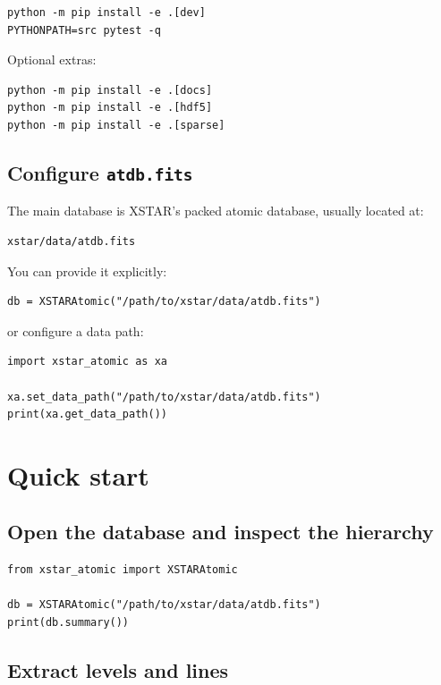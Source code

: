\documentclass[11pt]{article}
\begin{document}
\begin{lstlisting}[style=ctterminal]
python -m pip install -e .[dev]
PYTHONPATH=src pytest -q
\end{lstlisting}

Optional extras:

\begin{lstlisting}[style=ctterminal]
python -m pip install -e .[docs]
python -m pip install -e .[hdf5]
python -m pip install -e .[sparse]
\end{lstlisting}

\subsection{Configure \texttt{atdb.fits}}

The main database is XSTAR's packed atomic database, usually located at:

\begin{lstlisting}[style=ctterminal]
xstar/data/atdb.fits
\end{lstlisting}

You can provide it explicitly:

\begin{lstlisting}[style=ctpython]
db = XSTARAtomic("/path/to/xstar/data/atdb.fits")
\end{lstlisting}

or configure a data path:

\begin{lstlisting}[style=ctpython]
import xstar_atomic as xa

xa.set_data_path("/path/to/xstar/data/atdb.fits")
print(xa.get_data_path())
\end{lstlisting}

\section{Quick start}

\subsection{Open the database and inspect the hierarchy}

\begin{lstlisting}[style=ctpython]
from xstar_atomic import XSTARAtomic

db = XSTARAtomic("/path/to/xstar/data/atdb.fits")
print(db.summary())
\end{lstlisting}

\subsection{Extract levels and lines}
\end{document}
